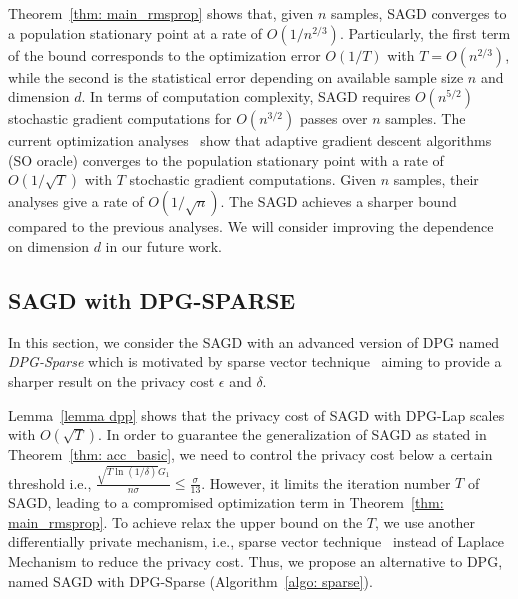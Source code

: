 \documentclass[11pt]{article}
\begin{document}
Theorem~\ref{thm: main_rmsprop} shows that, given $n$ samples, \textsc{SAGD} converges to a population stationary point at a rate of $O(1/n^{2/3})$. Particularly, the first term of the bound corresponds to the optimization error $O(1/T)$ with $T = O(n^{2/3})$, while the second is the statistical error depending on available sample size $n$ and dimension $d$. In terms of computation complexity, \textsc{SAGD} 
requires $O(n^{5/2})$ stochastic gradient computations for $O(n^{3/2})$ passes over $n$ samples. The current optimization analyses~\citep{zare18, wawu19, zosh2019, cheli2019} show that 
adaptive gradient descent algorithms (SO oracle) converges to the population stationary point with a rate of $O(1/\sqrt{T})$ with $T$ stochastic gradient computations. Given $n$ samples, their analyses give a rate of  $O(1/\sqrt{n})$. The \textsc{SAGD} achieves a sharper bound compared to the previous analyses.  
We will consider improving the dependence on dimension $d$ in our future work.



\vspace{-0.05in}
\subsection{\textsc{SAGD} with DPG-SPARSE} \label{subsec: SAGD-sparse}

In this section, we consider the \textsc{SAGD} with an advanced version of DPG named \emph{DPG-Sparse} which is motivated by sparse vector technique~\citep{dwro2014} aiming to provide a sharper result on the privacy cost $\epsilon$ and $\delta$.

Lemma~\ref{lemma dpp} shows that the privacy cost of \textsc{SAGD} with DPG-Lap scales with $O(\sqrt{T})$. In order to guarantee the generalization of \textsc{SAGD} as stated in Theorem~\ref{thm: acc_basic}, we need to control the privacy cost below a certain threshold i.e., $\frac{\sqrt{T \ln(1/\delta)} G_1}{n\sigma} \leq \frac{\sigma}{13}$. However, it limits the iteration number $T$ of \textsc{SAGD}, leading to a compromised optimization term in Theorem~\ref{thm: main_rmsprop}.  To achieve relax the upper bound on the $T$, we use another differentially private
mechanism, i.e., sparse vector technique~\citep{dwfe15,dwfe2015b,dwfe2015c,dwro2014} instead of Laplace Mechanism to reduce the privacy cost. Thus, we propose an alternative to DPG, named \textsc{SAGD} with DPG-Sparse (Algorithm~\ref{algo: sparse}).
\end{document}
